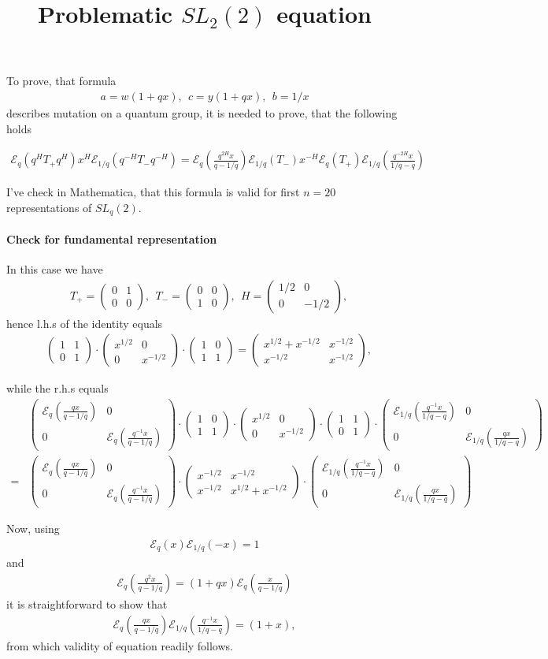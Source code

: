 \documentclass{article}
\title{{\bf Problematic $SL_2(2)$ equation \vspace{.2cm}}}
\newcommand{\lb}{\left (}
\newcommand{\rb}{\right )}
\newcommand{\be}{\begin{eqnarray}}
\newcommand{\ee}{\end{eqnarray}}
\newcommand {\?}{\textit{???}}
\newcommand{\me}[0]{\mathcal{E}}
\newcommand{\matd}[4]{\lb \begin{array}{cc}
#1 & #2 \\ #3 & #4
\end{array} \rb}
\begin{document}
 \maketitle

To prove, that formula
\be
a = w(1 + qx),\ \ c = y(1 + q x),\ \ b = 1/x
\ee
describes mutation on a quantum group, it is needed to prove, that the following holds

\be
\me_q(q^H T_+ q^H) x^H \me_{1/q}(q^{-H} T_- q^{-H}) = \me_q\lb \frac{q^{2H} x}{q - 1/q}\rb
\me_{1/q}(T_-) x^{-H} \me_{q}(T_+) \me_{1/q}\lb \frac{q^{-2H} x}{1/q - q}\rb
\ee

I've check in Mathematica, that this formula is valid for first $n = 20$ representations of $SL_q(2)$.

\paragraph{Check for fundamental representation}
In this case we have
\be
& T_+ = \matd{0}{1}{0}{0},\ \ T_- = \matd{0}{0}{1}{0},\ \ H = \matd{1/2}{0}{0}{-1/2},
\ee
hence l.h.s of the identity equals
\be
& \matd{1}{1}{0}{1} \cdot \matd{x^{1/2}}{0}{0}{x^{-1/2}}\cdot \matd{1}{0}{1}{1}
= \matd{x^{1/2}+x^{-1/2}}{x^{-1/2}}{x^{-1/2}}{x^{-1/2}},
\ee

while the r.h.s equals
\be
& \matd{\me_q\lb \frac{q x}{q - 1/q}\rb}{0}{0}{\me_q\lb \frac{q^{-1} x}{q - 1/q}\rb}
\cdot \matd{1}{0}{1}{1} \cdot \matd{x^{1/2}}{0}{0}{x^{-1/2}} \cdot \matd{1}{1}{0}{1} \cdot
\matd{\me_{1/q}\lb \frac{q^{-1} x}{1/q - q}\rb}{0}{0}{\me_{1/q}\lb \frac{q x}{1/q - q}\rb} & \\
= & \matd{\me_q\lb \frac{q x}{q - 1/q}\rb}{0}{0}{\me_q\lb \frac{q^{-1} x}{q - 1/q}\rb}
\cdot
\matd{x^{-1/2}}{x^{-1/2}}{x^{-1/2}}{x^{1/2} + x^{-1/2}}
\cdot \matd{\me_{1/q}\lb \frac{q^{-1} x}{1/q - q}\rb}{0}{0}{\me_{1/q}\lb \frac{q x}{1/q - q}\rb}
\ee

Now, using
\be
\me_q(x) \me_{1/q}(-x) = 1
\ee
and
\be
\me_q(\frac{q^2 x}{q - 1/q}) = (1 + qx) \me_q(\frac{x}{q - 1/q})
\ee
it is straightforward to show that
\be
\me_q\lb \frac{q x}{q - 1/q}\rb \me_{1/q}\lb \frac{q^{-1} x}{1/q - q}\rb = (1 + x),
\ee
from which validity of equation readily follows.
\end{document}
